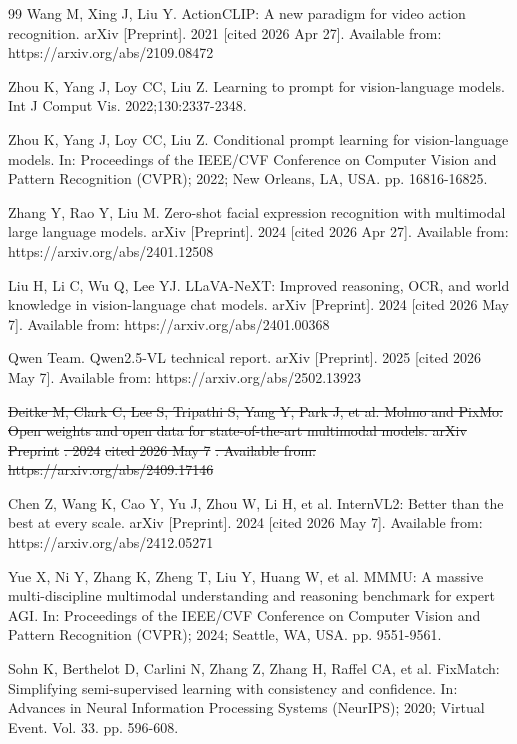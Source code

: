 \documentclass{ieeeaccess}
\providecommand{\DIFdel}[1]{{\protect\color{red}\sout{#1}}}                      %
\providecommand{\DIFdelbegin}{} %
\providecommand{\DIFdelend}{} %
\newcommand{\DIFscaledelfig}{0.5}
\newlength{\DIFdelgraphicswidth} %
\newlength{\DIFdelgraphicsheight} %
\newcommand{\DIFdelincludegraphics}[2][]{%
\sbox{\DIFdelgraphicsbox}{\DIFOincludegraphics[#1]{#2}}%
\settoboxwidth{\DIFdelgraphicswidth}{\DIFdelgraphicsbox} %
\settoboxtotalheight{\DIFdelgraphicsheight}{\DIFdelgraphicsbox} %
\scalebox{\DIFscaledelfig}{%
\parbox[b]{\DIFdelgraphicswidth}{\usebox{\DIFdelgraphicsbox}\\[-\baselineskip] \rule{\DIFdelgraphicswidth}{0em}}\llap{\resizebox{\DIFdelgraphicswidth}{\DIFdelgraphicsheight}{%
\setlength{\unitlength}{\DIFdelgraphicswidth}%
\begin{picture}(1,1)%
\thicklines\linethickness{2pt} %
{\color[rgb]{1,0,0}\put(0,0){\framebox(1,1){}}}%
{\color[rgb]{1,0,0}\put(0,0){\line( 1,1){1}}}%
{\color[rgb]{1,0,0}\put(0,1){\line(1,-1){1}}}%
\end{picture}%
}\hspace*{3pt}}} %
} %
\DeclareRobustCommand{\DIFdelbegin}{\DIFOdelbegin \let\includegraphics\DIFdelincludegraphics} %
\DeclareRobustCommand{\DIFdelend}{\DIFOaddend \let\includegraphics\DIFOincludegraphics} %
\begin{document}
\begin{thebibliography}{99}
Wang M, Xing J, Liu Y.
ActionCLIP: A new paradigm for video action recognition.
arXiv [Preprint]. 2021 [cited 2026 Apr 27]. Available from:
https://arxiv.org/abs/2109.08472

Zhou K, Yang J, Loy CC, Liu Z.
Learning to prompt for vision-language models.
Int J Comput Vis. 2022;130:2337-2348.

Zhou K, Yang J, Loy CC, Liu Z.
Conditional prompt learning for vision-language models.
In: Proceedings of the IEEE/CVF Conference on Computer Vision and
Pattern Recognition (CVPR); 2022; New Orleans, LA, USA.
pp. 16816-16825.

Zhang Y, Rao Y, Liu M.
Zero-shot facial expression recognition with multimodal large language
models. arXiv [Preprint]. 2024 [cited 2026 Apr 27]. Available from:
https://arxiv.org/abs/2401.12508

Liu H, Li C, Wu Q, Lee YJ.
LLaVA-NeXT: Improved reasoning, OCR, and world knowledge in
vision-language chat models. arXiv [Preprint]. 2024 [cited 2026 May 7].
Available from: https://arxiv.org/abs/2401.00368

Qwen Team.
Qwen2.5-VL technical report. arXiv [Preprint]. 2025 [cited 2026 May 7].
Available from: https://arxiv.org/abs/2502.13923

\DIFdelbegin {}
\DIFdel{Deitke M, Clark C, Lee S, Tripathi S, Yang Y, Park J, et al.
Molmo and PixMo: Open weights and open data for state-of-the-art
multimodal models. arXiv }%
\DIFdel{Preprint}%
\DIFdel{. 2024 }%
\DIFdel{cited 2026 May 7}%
\DIFdel{. Available
from: https://arxiv.org/abs/2409.17146
}%

\DIFdelend {}
Chen Z, Wang K, Cao Y, Yu J, Zhou W, Li H, et al.
InternVL2: Better than the best at every scale.
arXiv [Preprint]. 2024 [cited 2026 May 7]. Available from:
https://arxiv.org/abs/2412.05271

Yue X, Ni Y, Zhang K, Zheng T, Liu Y, Huang W, et al.
MMMU: A massive multi-discipline multimodal understanding and
reasoning benchmark for expert AGI. In: Proceedings of the IEEE/CVF
Conference on Computer Vision and Pattern Recognition (CVPR); 2024;
Seattle, WA, USA. pp. 9551-9561.

Sohn K, Berthelot D, Carlini N, Zhang Z, Zhang H, Raffel CA, et al.
FixMatch: Simplifying semi-supervised learning with consistency
and confidence.
In: Advances in Neural Information Processing Systems (NeurIPS);
2020; Virtual Event. Vol. 33. pp. 596-608.


\end{thebibliography}
\end{document}
